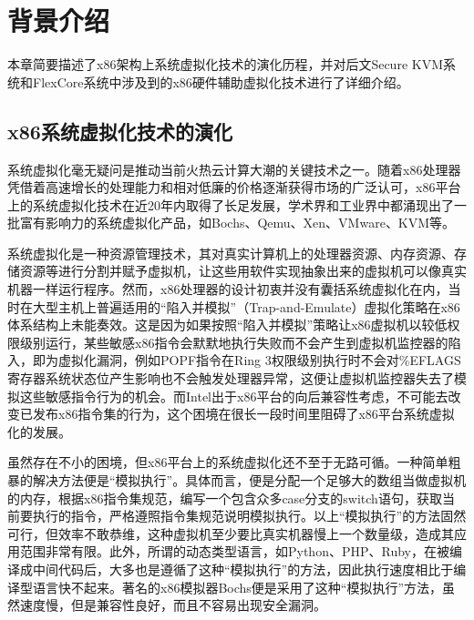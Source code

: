 
\chapter{背景介绍}
\label{chap:background}

本章简要描述了x86架构上系统虚拟化技术的演化历程，并对后文Secure KVM系统和FlexCore系统中涉及到的x86硬件辅助虚拟化技术进行了详细介绍。

\section{x86系统虚拟化技术的演化}

系统虚拟化毫无疑问是推动当前火热云计算大潮的关键技术之一。随着x86处理器凭借着高速增长的处理能力和相对低廉的价格逐渐获得市场的广泛认可，x86平台上的系统虚拟化技术在近20年内取得了长足发展，学术界和工业界中都涌现出了一批富有影响力的系统虚拟化产品，如Bochs\cite{lawton1996bochs}、Qemu\cite{bellard2005qemu}、Xen\cite{barham2003xen}、VMware\cite{sugerman2001virtualizing}、KVM\cite{kivity2007kvm}等。

系统虚拟化是一种资源管理技术，其对真实计算机上的处理器资源、内存资源、存储资源等进行分割并赋予虚拟机，让这些用软件实现抽象出来的虚拟机可以像真实机器一样运行程序。然而，x86处理器的设计初衷并没有囊括系统虚拟化在内，当时在大型主机上普遍适用的``陷入并模拟''（Trap-and-Emulate）虚拟化策略在x86体系结构上未能奏效\cite{robin2000analysis}。这是因为如果按照``陷入并模拟''策略让x86虚拟机以较低权限级别运行，某些敏感x86指令会默默地执行失败而不会产生到虚拟机监控器的陷入，即为虚拟化漏洞，例如POPF指令在Ring 3权限级别执行时不会对\%EFLAGS寄存器系统状态位产生影响也不会触发处理器异常，这便让虚拟机监控器失去了模拟这些敏感指令行为的机会。而Intel出于x86平台的向后兼容性考虑，不可能去改变已发布x86指令集的行为，这个困境在很长一段时间里阻碍了x86平台系统虚拟化的发展。

虽然存在不小的困境，但x86平台上的系统虚拟化还不至于无路可循。一种简单粗暴的解决方法便是``模拟执行''。具体而言，便是分配一个足够大的数组当做虚拟机的内存，根据x86指令集规范，编写一个包含众多case分支的switch语句，获取当前要执行的指令，严格遵照指令集规范说明模拟执行。以上``模拟执行''的方法固然可行，但效率不敢恭维，这种虚拟机至少要比真实机器慢上一个数量级，造成其应用范围非常有限。此外，所谓的动态类型语言，如Python、PHP、Ruby，在被编译成中间代码后，大多也是遵循了这种``模拟执行''的方法，因此执行速度相比于编译型语言快不起来。著名的x86模拟器Bochs便是采用了这种``模拟执行''方法，虽然速度慢，但是兼容性良好，而且不容易出现安全漏洞。

